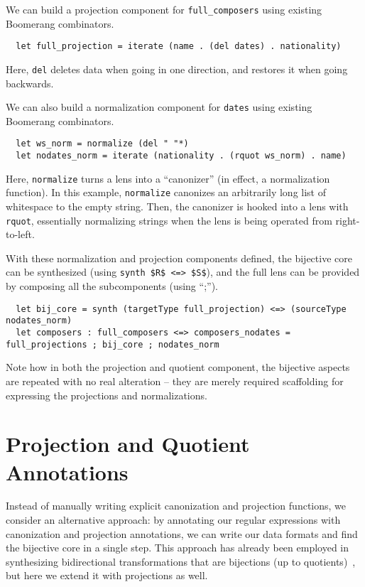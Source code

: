 \documentclass[a4paper]{article}
\begin{document}
We can build a projection component for \lstinline{full_composers} using
existing Boomerang combinators.
%
\begin{lstlisting}
  let full_projection = iterate (name . (del dates) . nationality)
\end{lstlisting}
%
Here, \lstinline{del} deletes data when going in one direction, and restores it
when going backwards.

We can also build a normalization component for \lstinline{dates} using existing
Boomerang combinators.
%
\begin{lstlisting}
  let ws_norm = normalize (del " "*)
  let nodates_norm = iterate (nationality . (rquot ws_norm) . name)
\end{lstlisting}
%
Here, \lstinline{normalize} turns a lens into a ``canonizer'' (in effect, a
normalization function). In this example, \lstinline{normalize} canonizes an
arbitrarily long list of whitespace to the empty string. Then, the canonizer is
hooked into a lens with \lstinline{rquot}, essentially normalizing strings when
the lens is being operated from right-to-left.

With these normalization and projection components defined, the bijective core
can be synthesized (using \lstinline{synth $R$ <=> $S$}), and the full lens can be
provided by composing all the subcomponents (using ``;'').
\begin{lstlisting}
  let bij_core = synth (targetType full_projection) <=> (sourceType nodates_norm)
  let composers : full_composers <=> composers_nodates = full_projections ; bij_core ; nodates_norm
\end{lstlisting}

Note how in both the projection and quotient component, the bijective aspects
are repeated with no real alteration -- they are merely required scaffolding
for expressing the projections and normalizations.

\section{Projection and Quotient Annotations}

Instead of manually writing explicit canonization and projection functions, we
consider an alternative approach: by annotating our regular expressions with
canonization and projection annotations, we can write our data formats and find
the bijective core in a single step. This approach has already been employed in
synthesizing bidirectional transformations that are bijections (up to
quotients)~\cite{maina+:quotient-synthesis}, but here we extend it with projections as well.
\end{document}
